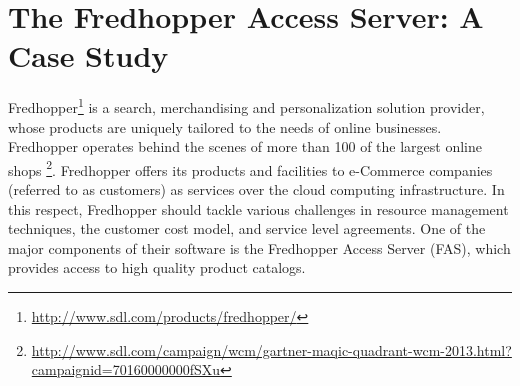 \section{The Fredhopper Access Server: A Case Study} \label{ch05:sec:frh}

Fredhopper\footnote{\url{http://www.sdl.com/products/fredhopper/}} is a
search, merchandising and personalization solution provider, whose
products are uniquely tailored to the needs of online businesses. Fredhopper operates behind the scenes of more than 100 of the largest online
shops
\footnote{\url{http://www.sdl.com/campaign/wcm/gartner-maqic-quadrant-wcm-2013.html?campaignid=70160000000fSXu}}.
Fredhopper offers its products and facilities to e-Commerce
companies (referred to as customers) as services over the cloud computing infrastructure.
In this respect, Fredhopper should tackle various challenges in
resource management techniques, the customer cost model, and service level agreements.
One of the major components of their software is the Fredhopper Access Server (FAS), which provides access to high quality product catalogs.

